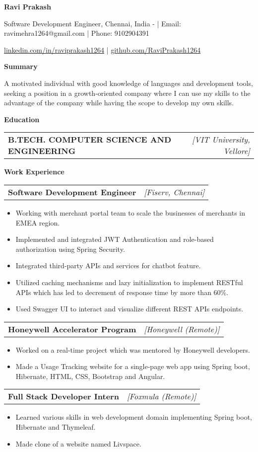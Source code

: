 \documentclass[a4paper,10pt]{article}
\makeatletter
\newcommand{\resitem}[1]{\item #1}
\newcommand{\resheading}[1]{\vspace{0.5em} {\small \colorbox{mygrey}{{\begin{minipage}{0.975\textwidth}{{\textbf{#1}}}\end{minipage}}}} \vspace{0.5em}}
\newcommand{\ressubheading}[3]{\begin{tabular*}{6.62in}{l @{\extracolsep{\fill}} r} \textbf{#1} & \textit{[#2]} \\ \end{tabular*}\vspace{-8pt}}
\makeatother
\begin{document}
\begin{center} \Large{\textbf{Ravi Prakash}} \end{center}

\vspace{2pt}

\begin{center} Software Development Engineer, Chennai, India - | Email: ravimehra1264@gmail.com | Phone: 9102904391 \end{center}
\begin{center} \href{linkedin.com/in/raviprakash1264}{linkedin.com/in/raviprakash1264} | \href{github.com/RaviPrakash1264}{github.com/RaviPrakash1264} \end{center}

\resheading{Summary}
\resitem{A motivated individual with good knowledge of languages and development tools, seeking a position in a growth-oriented company where I can use my skills to the advantage of the company while having the scope to develop my own skills.}

\resheading{Education}
\ressubheading{B.TECH. COMPUTER SCIENCE AND ENGINEERING}{VIT University, Vellore}{07/2018 - 06/2022, 8.45}

\resheading{Work Experience}
\ressubheading{Software Development Engineer}{Fiserv, Chennai}{08/2022 - Present}
\begin{itemize}[noitemsep]
    \resitem{Working with merchant portal team to scale the businesses of merchants in EMEA region.}
    \resitem{Implemented and integrated JWT Authentication and role-based authorization using Spring Security.}
    \resitem{Integrated third-party APIs and services for chatbot feature.}
    \resitem{Utilized caching mechanisms and lazy initialization to implement RESTful APIs which has led to decrement of response time by more than 60\%.}
    \resitem{Used Swagger UI to interact and visualize different REST APIs endpoints.}
\end{itemize}
\ressubheading{Honeywell Accelerator Program}{Honeywell (Remote)}{08/2020 - 12/2020}
\begin{itemize}[noitemsep]
    \resitem{Worked on a real-time project which was mentored by Honeywell developers.}
    \resitem{Made a Usage Tracking website for a single-page web app using Spring boot, Hibernate, HTML, CSS, Bootstrap and Angular.}
\end{itemize}
\ressubheading{Full Stack Developer Intern}{Foxmula (Remote)}{03/2020 - 05/2020}
\begin{itemize}[noitemsep]
    \resitem{Learned various skills in web development domain implementing Spring boot, Hibernate and Thymeleaf.}
    \resitem{Made clone of a website named Livspace.}
\end{itemize}
\end{document}
